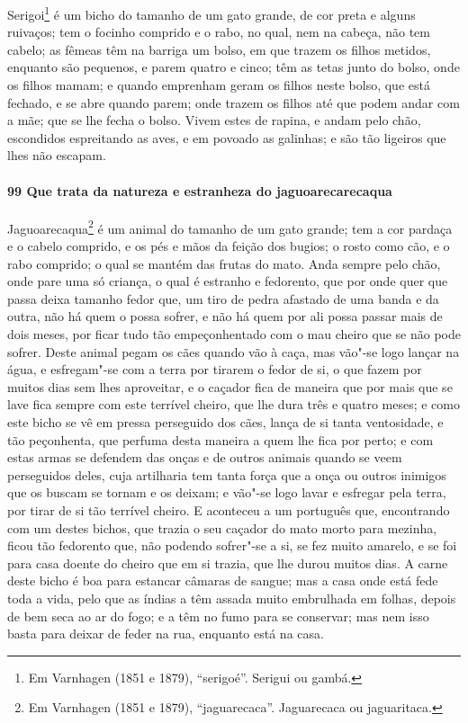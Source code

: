 Serigoi\footnote{ Em Varnhagen (1851 e 1879), ``serigoé''. Serigui ou gambá.} é um bicho
do tamanho de um gato grande, de cor preta e alguns ruivaços; tem o focinho comprido e o
rabo, no qual, nem na cabeça, não tem cabelo; as fêmeas têm na barriga um bolso, em que
trazem os filhos metidos, enquanto são pequenos, e parem quatro e cinco; têm as tetas
junto do bolso, onde os filhos mamam; e quando emprenham geram os filhos neste bolso, que
está fechado, e se abre quando parem; onde trazem os filhos até que podem andar com a mãe;
que se lhe fecha o bolso. Vivem estes de rapina, e andam pelo chão, escondidos espreitando
as aves, e em povoado as galinhas; e são tão ligeiros que lhes não escapam.

\paragraph{99 Que trata da natureza e estranheza do jaguoarecarecaqua}

Jaguoarecaqua\footnote{ Em Varnhagen (1851 e 1879), ``jaguarecaca''. Jaguarecaca ou
jaguaritaca.} é um animal do tamanho de um gato grande; tem a cor pardaça e o cabelo
comprido, e os pés e mãos da feição dos bugios; o rosto como cão, e o rabo comprido; o
qual se mantém das frutas do mato. Anda sempre pelo chão, onde pare uma só criança, o qual
é estranho e fedorento, que por onde quer que passa deixa tamanho fedor que, um tiro de
pedra afastado de uma banda e da outra, não há quem o possa sofrer, e não há quem por ali
possa passar mais de dois meses, por ficar tudo tão empeçonhentado com o mau cheiro que se
não pode sofrer. Deste animal pegam os cães quando vão à caça, mas vão"-se logo lançar na
água, e esfregam"-se com a terra por tirarem o fedor de si, o que fazem por muitos dias sem
lhes aproveitar, e o caçador fica de maneira que por mais que se lave fica sempre com este
terrível cheiro, que lhe dura três e quatro meses; e como este bicho se vê em pressa
perseguido dos cães, lança de si tanta ventosidade, e tão peçonhenta, que perfuma desta
maneira a quem lhe fica por perto; e com estas armas se defendem das onças e de outros
animais quando se veem perseguidos deles, cuja artilharia tem tanta força que a onça ou
outros inimigos que os buscam se tornam e os deixam; e vão"-se logo lavar e esfregar pela
terra, por tirar de si tão terrível cheiro. E aconteceu a um português que, encontrando
com um destes bichos, que trazia o seu caçador do mato morto para mezinha, ficou tão
fedorento que, não podendo sofrer"-se a si, se fez muito amarelo, e se foi para casa doente
do cheiro que em si trazia, que lhe durou muitos dias. A carne deste bicho é boa para
estancar câmaras de sangue; mas a casa onde está fede toda a vida, pelo que as índias a
têm assada muito embrulhada em folhas, depois de bem seca ao ar do fogo; e a têm no fumo
para se conservar; mas nem isso basta para deixar de feder na rua, enquanto está na casa.

